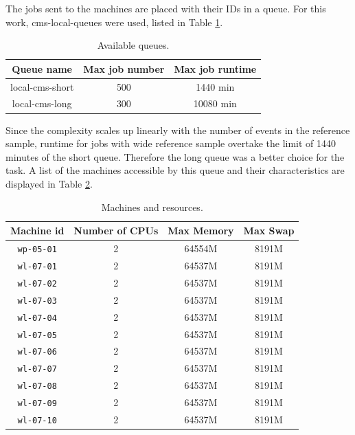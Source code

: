 The jobs sent to the machines are placed with their IDs in a queue. For this work, cms-local-queues were used, listed in Table \ref{tab:QUEUES}.

\begin{table}[H]
	\centering
	\begin{tabular}{c c c}
		\toprule
		\toprule
		Queue name	&	Max job number	&	Max job runtime	\\
		\midrule
		local-cms-short	&	500			&	1440 min		\\
		local-cms-long	&	300			&	10080 min		\\
		\bottomrule
		\bottomrule
	\end{tabular}
	\caption{Available queues.}
	\label{tab:QUEUES}
\end{table}

\noindent
Since the complexity scales up linearly with the number of events in the reference sample, runtime for jobs with wide reference sample overtake the limit of 1440 minutes of the short queue. Therefore the long queue was a better choice for the task. A list of the machines accessible by this queue and their characteristics are displayed in Table \ref{tab:LONG_QUEUE_MACHINES}.

\begin{table}[H]
	\centering
	\begin{tabular}{c c c c}
	\toprule
	\toprule
	Machine id	&	Number of CPUs	&	Max Memory		&	Max Swap	\\
	\midrule
	\texttt{wp-05-01}	&	2	&	64554M  &	8191M	\\
	\texttt{wl-07-01}	&	2	&	64537M  &	8191M	\\
	\texttt{wl-07-02}	&	2	&	64537M  &	8191M	\\
	\texttt{wl-07-03}	&	2	&	64537M  &	8191M	\\
	\texttt{wl-07-04}	&	2	&	64537M  &	8191M	\\
	\texttt{wl-07-05}	&	2	&	64537M  &	8191M	\\
	\texttt{wl-07-06}	&	2	&	64537M  &	8191M	\\
	\texttt{wl-07-07}	&	2	&	64537M  &	8191M	\\
	\texttt{wl-07-08}	&	2	&	64537M  &	8191M	\\
	\texttt{wl-07-09}	&	2	&	64537M  &	8191M	\\
	\texttt{wl-07-10}	&	2	&	64537M  &	8191M	\\
	\bottomrule
	\bottomrule
	\end{tabular}
	\caption{Machines and resources.}
	\label{tab:LONG_QUEUE_MACHINES}
\end{table}






